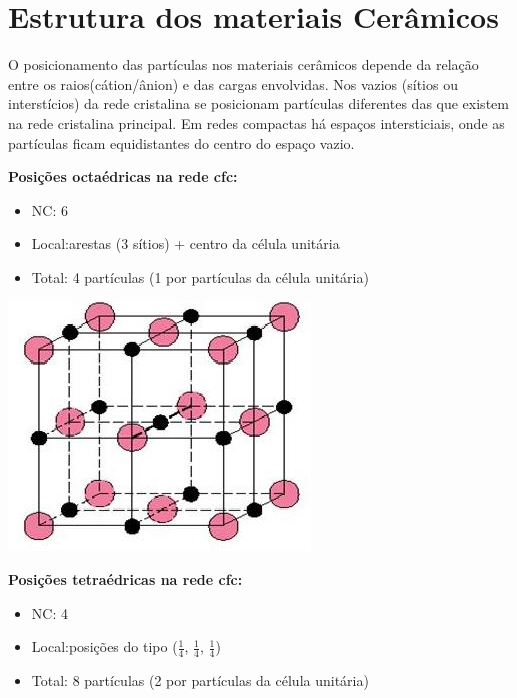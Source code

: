  \section{Estrutura dos materiais Cerâmicos}
 
O posicionamento das partículas nos materiais cerâmicos depende da relação entre os raios(cátion/ânion) e das cargas envolvidas. Nos vazios (sítios ou interstícios) da rede cristalina se posicionam partículas diferentes das que existem na rede cristalina principal. Em redes compactas há espaços intersticiais, onde as partículas ficam equidistantes do centro do espaço vazio.
 

\textbf{Posições octaédricas na rede cfc:}

 \begin{itemize}
 	
 	\setlength{\parskip}{0pt}
 	\setlength{\itemsep}{0pt plus 1pt}
 	
 	\item NC: 6
 	\item Local:arestas (3 sítios) + centro da célula unitária
 	\item Total: 4 partículas (1 por partículas da célula unitária)
 \end{itemize}

 \includegraphics[scale=0.5,trim={0 0 0 0}]{figures/occfc}
 
 
\textbf{ Posições tetraédricas na rede cfc:}

  \begin{itemize}
 	
 	\setlength{\parskip}{0pt}
 	\setlength{\itemsep}{0pt plus 1pt}
 	
 	\item NC: 4
 	\item Local:posições do tipo ($\frac{1}{4}$, $\frac{1}{4}$, $\frac{1}{4}$)
 	\item Total: 8 partículas (2 por partículas	da célula unitária)
 \end{itemize}

